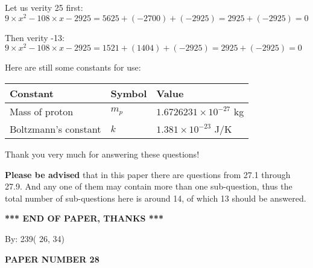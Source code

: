 \documentclass[12pt]{article}
\begin{document}
Let us verity  %
25 first:
$  %
9 \times x^2  %
-108
                 \times x    %
-2925
  = %
5625+( %
-2700)+( %
-2925)
  = %
2925+( %
-2925)
  = %
0
$
 
Then verity  %
-13:
$  %
9 \times x^2  %
-108
                 \times x    %
-2925
  = %
1521+( %
1404)+( %
-2925)
  = %
2925+( %
-2925)
  = %
0
$
 
 
 
   
   
 \vspace{0.2in}
Here are still some constants for use:
 
 
\noindent\begin{tabular}{|l|l|l|}
\hline
Constant & Symbol & Value \\
\hline
 
Mass of proton &
$m_p$ &
 $ 1.6726231 \times 10^{-27} $
kg \\
\hline
 
Boltzmann's constant &
$k$ &
 $ 1.381 \times 10^{-23} $
J/K \\
\hline
 
\end{tabular}
 
Thank you very much for answering these questions!
 
{\textbf{\large{Please be advised}}} that in this paper there are questions from
27.1 through
27.9.
And any one of them may contain more than one sub-question, thus the total number
of sub-questions here is around 14, of which
13 should be answered.
 
   
   
   
   
\vspace{1.0in} 
{\textbf{\large{ *** END OF PAPER, THANKS *** }}} 
   
   
\hspace{1.0in} By: 
         239(         26,          34)
   
   
   
   
\newpage 
\setcounter{page}{ 
    28001 } 
   
   
   
   
 {\textbf{ \Large{ PAPER NUMBER          28 }}}
   
   
\vspace{0.2in}
   
   
   
\end{document}
